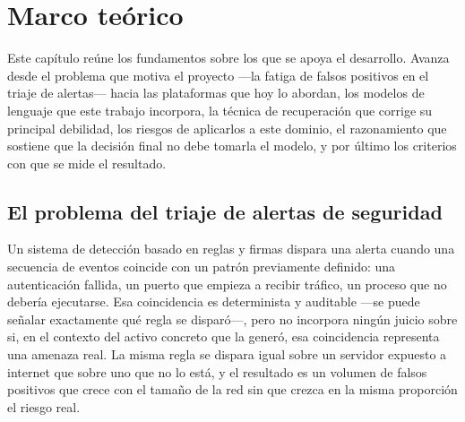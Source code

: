 
\chapter{Marco teórico}

Este capítulo reúne los fundamentos sobre los que se apoya el desarrollo. Avanza desde el
problema que motiva el proyecto ---la fatiga de falsos positivos en el triaje de alertas--- hacia las
plataformas que hoy lo abordan, los modelos de lenguaje que este trabajo incorpora, la técnica de
recuperación que corrige su principal debilidad, los riesgos de aplicarlos a este dominio, el
razonamiento que sostiene que la decisión final no debe tomarla el modelo, y por último los
criterios con que se mide el resultado.

\section{El problema del triaje de alertas de seguridad}
\label{sec:problema-triaje-referencia}

Un sistema de detección basado en reglas y firmas dispara una alerta cuando una secuencia de
eventos coincide con un patrón previamente definido: una autenticación fallida, un puerto que
empieza a recibir tráfico, un proceso que no debería ejecutarse. Esa coincidencia es determinista y
auditable ---se puede señalar exactamente qué regla se disparó---, pero no incorpora ningún juicio
sobre si, en el contexto del activo concreto que la generó, esa coincidencia representa una
amenaza real. La misma regla se dispara igual sobre un servidor expuesto a internet que sobre uno
que no lo está, y el resultado es un volumen de falsos positivos que crece con el tamaño de la red
sin que crezca en la misma proporción el riesgo real.

